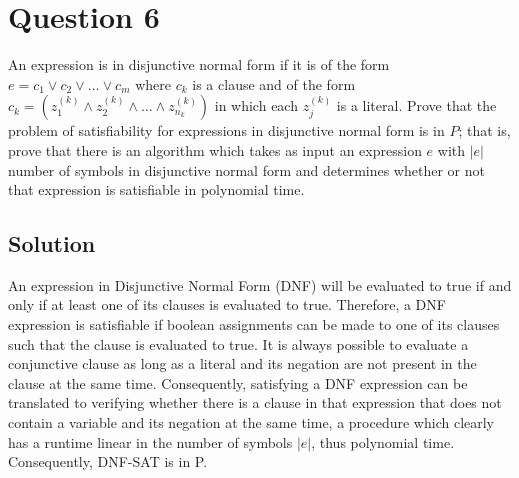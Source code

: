 
\section*{Question 6}

An expression is in disjunctive normal form if it is of the form $e = c_1 \vee c_2 \vee \dots \vee c_m$ where $c_k$ is a clause and of the form $c_k = (z_1^{(k)} \wedge z_2^{(k)} \wedge \dots \wedge z_{n_k}^{(k)})$ in which each $z_j^{(k)}$ is a literal. Prove that the problem of satisfiability for expressions in disjunctive normal form is in $P$; that is, prove that there is an algorithm which takes as input an expression $e$ with $|e|$ number of symbols in disjunctive normal form and determines whether or not that expression is satisfiable in polynomial time.

\subsection*{Solution}

An expression in Disjunctive Normal Form (DNF) will be evaluated to true if and only if at least one of its clauses is evaluated to true. Therefore, a DNF expression is satisfiable if boolean assignments can be made to one of its clauses such that the clause is evaluated to true. It is always possible to evaluate a conjunctive clause as long as a literal and its negation are not present in the clause at the same time. Consequently, satisfying a DNF expression can be translated to verifying whether there is a clause in that expression that does not contain a variable and its negation at the same time, a procedure which clearly has a runtime linear in the number of symbols $|e|$, thus polynomial time. Consequently, DNF-SAT is in P.
